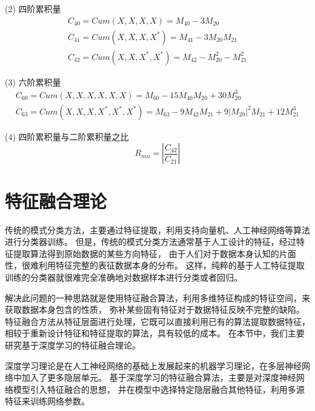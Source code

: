 (2) 四阶累积量
\begin{equation}
\label{eqt_4_11}
\begin{aligned}
C_{40}=Cum(X, X, X, X) = M_{40} - 3M_{20}\\
C_{41}=Cum(X, X, X, X^*) = M_{41} - 3M_{20}M_{21}\\
C_{42}=Cum(X, X, X^*, X^*) = M_{42} - M_{20}^2 - M_{21}^2
\end{aligned}
\end{equation}

(3) 六阶累积量
\begin{equation}
\label{eqt_4_12}
\begin{aligned}
C_{60}=Cum(X, X, X, X, X, X) = M_{60} - 15M_{40}M_{20} + 30M_{20}^3\\
C_{63}=Cum(X, X, X, X^*, X^*, X^*) = M_{63} - 9M_{42}M_{21} 
+ 9\left|M_{20}\right|^2M_{21} + 12M_{21}^3
\end{aligned}
\end{equation}

(4) 四阶累积量与二阶累积量之比
\begin{equation}
\label{eqt_4_13}
R_{mn} = |\frac{C_{42}}{C_{21}}|
\end{equation}

\section{特征融合理论}
传统的模式分类方法，主要通过特征提取，利用支持向量机、人工神经网络等算法进行分类器训练。 
但是，传统的模式分类方法通常基于人工设计的特征，经过特征提取算法得到原始数据的某些方向特征，
由于人们对于数据本身认知的片面性，很难利用特征完整的表征数据本身的分布。
这样，纯粹的基于人工特征提取训练的分类器就很难完全准确地对数据样本进行分类或者回归。\par

解决此问题的一种思路就是使用特征融合算法，利用多维特征构成的特征空间，来获取数据本身包含的性质，
弥补某些固有特征对于数据特征反映不完整的缺陷。
特征融合方法从特征层面进行处理，它既可以直接利用已有的算法提取数据特征，
相较于重新设计特征和特征提取的算法，具有较低的成本。
在本节中，我们主要研究基于深度学习的特征融合理论。\par

深度学习理论是在人工神经网络的基础上发展起来的机器学习理论，在多层神经网络中加入了更多隐层单元。
基于深度学习的特征融合算法，主要是对深度神经网络模型引入特征融合的思想，
并在模型中选择特定隐层融合其他特征，利用多源特征来训练网络参数。\par

